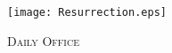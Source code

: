 \fancyhead[RE,LO]{}\fancyhead[RO,LE]{}
\fancyhead[C]{}\thispagestyle{empty}
\mainmatter
{}
{}
  \begin{center}
   \texttt{[image: Resurrection.eps]}
   \par
   \vspace{2ex}
   	\textsc{\Huge{Daily Office}}
   \end{center}